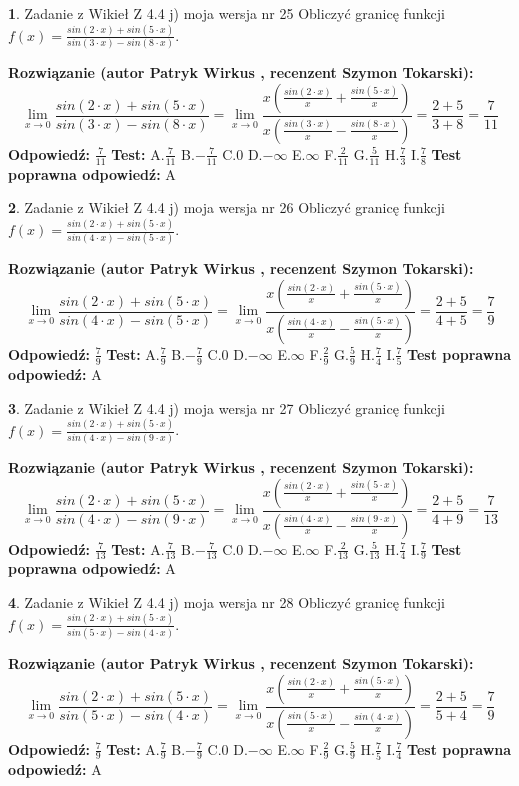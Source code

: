 \documentclass[12pt, a4paper]{article}
\theoremstyle{definition} %
\newtheorem{zad}{}
\newcommand{\zadStart}[1]{\begin{zad}#1\newline}
\newcommand{\zadStop}{\end{zad}}
\newcommand{\rozwStart}[2]{\noindent \textbf{Rozwiązanie (autor #1 , recenzent #2): }\newline}
\newcommand{\rozwStop}{\newline}
\newcommand{\odpStart}{\noindent \textbf{Odpowiedź:}\newline}
\newcommand{\odpStop}{\newline}
\newcommand{\testStart}{\noindent \textbf{Test:}\newline}
\newcommand{\testStop}{\newline}
\newcommand{\kluczStart}{\noindent \textbf{Test poprawna odpowiedź:}\newline}
\newcommand{\kluczStop}{\newline}
\begin{document}
\zadStart{Zadanie z Wikieł Z 4.4 j) moja wersja nr 25}
Obliczyć granicę funkcji $f(x)=\frac{sin(2\cdot x) +sin(5\cdot x)}{sin(3\cdot x) -sin(8\cdot x)}$.
\zadStop
\rozwStart{Patryk Wirkus}{Szymon Tokarski}
$$\lim\limits_{x\to 0}\frac{sin(2\cdot x) +sin(5\cdot x)}{sin(3\cdot x) -sin(8\cdot x)}=\lim\limits_{x\to 0}\frac{x(\frac{sin(2\cdot x)}{x}+\frac{sin(5\cdot x)}{x})}{x(\frac{sin(3\cdot x)}{x}-\frac{sin(8\cdot x)}{x})}=\frac{2+5}{3+8} = \frac{7}{11}$$
\rozwStop
\odpStart
$\frac{7}{11}$
\odpStop
\testStart
A.$\frac{7}{11}$
B.$-\frac{7}{11}$
C.$0$
D.$-\infty$
E.$\infty$
F.$\frac{2}{11}$
G.$\frac{5}{11}$
H.$\frac{7}{3}$
I.$\frac{7}{8}$
\testStop
\kluczStart
A
\kluczStop



\zadStart{Zadanie z Wikieł Z 4.4 j) moja wersja nr 26}
Obliczyć granicę funkcji $f(x)=\frac{sin(2\cdot x) +sin(5\cdot x)}{sin(4\cdot x) -sin(5\cdot x)}$.
\zadStop
\rozwStart{Patryk Wirkus}{Szymon Tokarski}
$$\lim\limits_{x\to 0}\frac{sin(2\cdot x) +sin(5\cdot x)}{sin(4\cdot x) -sin(5\cdot x)}=\lim\limits_{x\to 0}\frac{x(\frac{sin(2\cdot x)}{x}+\frac{sin(5\cdot x)}{x})}{x(\frac{sin(4\cdot x)}{x}-\frac{sin(5\cdot x)}{x})}=\frac{2+5}{4+5} = \frac{7}{9}$$
\rozwStop
\odpStart
$\frac{7}{9}$
\odpStop
\testStart
A.$\frac{7}{9}$
B.$-\frac{7}{9}$
C.$0$
D.$-\infty$
E.$\infty$
F.$\frac{2}{9}$
G.$\frac{5}{9}$
H.$\frac{7}{4}$
I.$\frac{7}{5}$
\testStop
\kluczStart
A
\kluczStop



\zadStart{Zadanie z Wikieł Z 4.4 j) moja wersja nr 27}
Obliczyć granicę funkcji $f(x)=\frac{sin(2\cdot x) +sin(5\cdot x)}{sin(4\cdot x) -sin(9\cdot x)}$.
\zadStop
\rozwStart{Patryk Wirkus}{Szymon Tokarski}
$$\lim\limits_{x\to 0}\frac{sin(2\cdot x) +sin(5\cdot x)}{sin(4\cdot x) -sin(9\cdot x)}=\lim\limits_{x\to 0}\frac{x(\frac{sin(2\cdot x)}{x}+\frac{sin(5\cdot x)}{x})}{x(\frac{sin(4\cdot x)}{x}-\frac{sin(9\cdot x)}{x})}=\frac{2+5}{4+9} = \frac{7}{13}$$
\rozwStop
\odpStart
$\frac{7}{13}$
\odpStop
\testStart
A.$\frac{7}{13}$
B.$-\frac{7}{13}$
C.$0$
D.$-\infty$
E.$\infty$
F.$\frac{2}{13}$
G.$\frac{5}{13}$
H.$\frac{7}{4}$
I.$\frac{7}{9}$
\testStop
\kluczStart
A
\kluczStop



\zadStart{Zadanie z Wikieł Z 4.4 j) moja wersja nr 28}
Obliczyć granicę funkcji $f(x)=\frac{sin(2\cdot x) +sin(5\cdot x)}{sin(5\cdot x) -sin(4\cdot x)}$.
\zadStop
\rozwStart{Patryk Wirkus}{Szymon Tokarski}
$$\lim\limits_{x\to 0}\frac{sin(2\cdot x) +sin(5\cdot x)}{sin(5\cdot x) -sin(4\cdot x)}=\lim\limits_{x\to 0}\frac{x(\frac{sin(2\cdot x)}{x}+\frac{sin(5\cdot x)}{x})}{x(\frac{sin(5\cdot x)}{x}-\frac{sin(4\cdot x)}{x})}=\frac{2+5}{5+4} = \frac{7}{9}$$
\rozwStop
\odpStart
$\frac{7}{9}$
\odpStop
\testStart
A.$\frac{7}{9}$
B.$-\frac{7}{9}$
C.$0$
D.$-\infty$
E.$\infty$
F.$\frac{2}{9}$
G.$\frac{5}{9}$
H.$\frac{7}{5}$
I.$\frac{7}{4}$
\testStop
\kluczStart
A
\kluczStop
\end{document}
